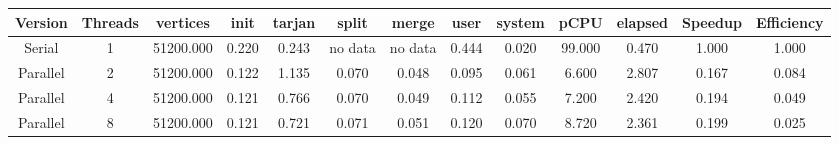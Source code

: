 \begin{tabular}{|c|c|c|c|c|c|c|c|c|c|c|c|c|}
\toprule
 Version &  Threads &  vertices &  init &  tarjan &   split &   merge &  user &  system &   pCPU &  elapsed &  Speedup &  Efficiency \\
\midrule
  Serial &        1 & 51200.000 & 0.220 &   0.243 & no data & no data & 0.444 &   0.020 & 99.000 &    0.470 &    1.000 &       1.000 \\
Parallel &        2 & 51200.000 & 0.122 &   1.135 &   0.070 &   0.048 & 0.095 &   0.061 &  6.600 &    2.807 &    0.167 &       0.084 \\
Parallel &        4 & 51200.000 & 0.121 &   0.766 &   0.070 &   0.049 & 0.112 &   0.055 &  7.200 &    2.420 &    0.194 &       0.049 \\
Parallel &        8 & 51200.000 & 0.121 &   0.721 &   0.071 &   0.051 & 0.120 &   0.070 &  8.720 &    2.361 &    0.199 &       0.025 \\
\bottomrule
\end{tabular}
